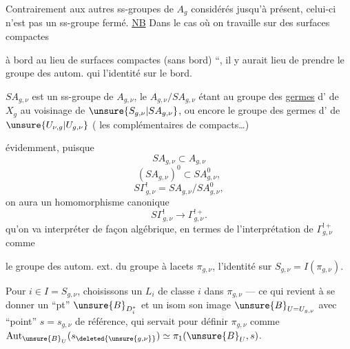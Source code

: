 Contrairement aux autres ss-groupes de $A_g$ considérés jusqu'à présent, celui-ci n'est pas un ss-groupe fermé. \uline{NB} Dans le cas où on travaille sur des surfaces compactes


à bord au lieu de surfaces compactes (sans bord) ``, il y aurait lieu de prendre le groupe des autom. qui  l'identité sur le bord.

$SA_{g,\nu}$ est un ss-groupe  de $A_{g,\nu}$, le  $A_{g,\nu}/SA_{g,\nu}$ étant  au groupe des \uline{germes} d' de $X_g$ au voisinage de $\unsure{S_{g,\nu}|SA_{g,\nu}}$, ou encore le groupe des germes  d' de $\unsure{U_{\nu,g}|U_{g,\nu}}$ ( les complémentaires de compacts\ldots)

  évidemment, puisque
\[
SA_{g,\nu}\subset A_{g,\nu}
\]
\[
(SA_{g,\nu})^{0}\subset SA_{g,\nu}^{0},
\]
\[
S\Gamma_{g,\nu}^{!}=SA_{g,\nu}/SA_{g,\nu}^{0},
\]
on aura un homomorphisme canonique
\[
S\Gamma_{g,\nu}^{!}\longrightarrow\Gamma_{g,\nu}^{!+}.
\]
qu'on va interpréter de façon algébrique, en termes de l'interprétation de $\Gamma_{g,\nu}^{!+}$ \inserted{$=\Gamma^{!}$} comme


le groupe des autom. ext. du groupe à lacets $\pi_{g,\nu}$,  l'identité sur $S_{g,\nu}=I(\pi_{g,\nu})$.

  Pour $i\in I=S_{g,\nu}$, choisissons un \deleted{$\unsure{\ell}$} $L_i$ de classe $i$ dans $\pi_{g,\nu}$ --- ce qui revient à se donner un ``pt''  $\unsure{B}_{D_i^{*}}$   et un isom  son image  $\unsure{B}_{U=U_{g,\nu}}$ avec  ``point'' $s=s_{g,\nu}$ de référence, qui servait pour définir $\pi_{g,\nu}$ comme $\operatorname{Aut}_{\unsure{B}_U}(s_{\deleted{\unsure{g,\nu}}})\simeq\pi_1(\unsure{B}_U,s)$.


